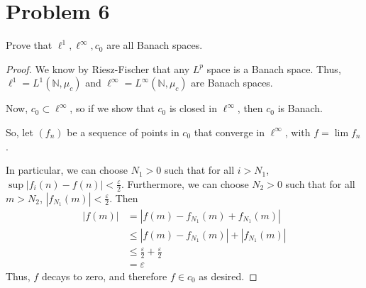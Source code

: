 \documentclass[fontsize=11pt]{scrartcl} %
\numberwithin{equation}{section} %
\numberwithin{figure}{section} %
\numberwithin{table}{section} %
\newcommand{\N}{\mathbb{N}}
\begin{document}
\section*{Problem 6}
Prove that $\ell^1,\ell^{\infty},c_0$ are all Banach spaces.
\\
\begin{proof}
    We know by Riesz-Fischer that any $L^p$ space is a Banach space. Thus,
    $\ell^1=L^1(\N,\mu_c)$ and $\ell^{\infty} = L^{\infty}(\N,\mu_c)$ are
    Banach spaces.

    Now, $c_0 \subset \ell^{\infty}$, so if we show that $c_0$ is closed in
    $\ell^{\infty}$, then $c_0$ is Banach.

    So, let $(f_n)$ be a sequence of points in $c_0$ that converge in
    $\ell^{\infty}$, with $f = \lim f_n$.

    In particular, we can choose $N_1>0$ such that for all $i>N_1$, $\sup
    |f_i(n) - f(n)| < \frac{\varepsilon}{2}$. Furthermore, we can choose $N_2>0$
    such that for all $m>N_2$, $|f_{N_1}(m)|<\frac{\varepsilon}{2}$. Then
    \[
        \begin{aligned}
            |f(m)| &= |f(m)-f_{N_1}(m)+f_{N_1}(m)|\\
                    &\leq |f(m) - f_{N_1}(m)| + |f_{N_1}(m)|\\
                    &\leq \frac{\varepsilon}{2}+\frac{\varepsilon}{2}\\
                    &=\varepsilon
        \end{aligned}
    \]
    Thus, $f$ decays to zero, and therefore $f\in c_0$ as desired.
\end{proof}
\newpage
\end{document}
